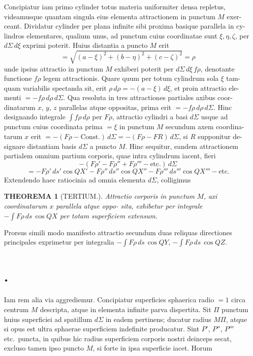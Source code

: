 \documentclass[12pt,a4paper]{article}
\theoremstyle{gauss}
\newtheorem*{theorema}{THEOREMA}
\begin{document}
Concipiatur iam primo cylinder totus materia uniformiter densa repletus,
videamusque quantam singula eius elementa attractionem in punctum $M$ exer-
ceant. Dividatur cylinder per plana infinite sibi proxima basique parallela in cy-
lindros elementares, qualium unus, ad punctum cuius coordinatae sunt $\xi,\eta,\zeta$,
per $d\Sigma\,d\xi$ exprimi poterit. Huius distantia a puncto $M$ erit
\[
= \sqrt{(a-\xi)^2 + (b-\eta)^2 + (c-\zeta)^2} = \rho
\]
unde ipsius attractio in punctum $M$ exhiberi poterit per $d\Sigma\,d\xi\,f\rho$, denotante
functione $f\rho$ legem attractionis. Quare quum per totum cylindrum sola $\xi$ tam-
quam variabilis spectanda sit, erit $\rho\,d\rho = -(a-\xi)\,d\xi$, et proin attractio ele-
menti $= -f\rho\,d\rho\,d\Sigma$. Qua resoluta in tres attractiones partiales axibus coor-
dinatarum $x$, $y$, $z$ parallelas atque oppositas, prima erit $= -f\rho\,d\rho\,d\Sigma$. Hinc
designando integrale $\int f\rho\,d\rho$ per $F\rho$, attractio cylindri a basi $d\Sigma$ usque ad
punctum cuius coordinata prima $=\xi$ in punctum $M$ secundum axem coordina-
tarum $x$ erit $= -(F\rho - \text{Const.})\,d\Sigma = -(F\rho - FR)\,d\Sigma$, si $R$ supponitur de-
signare distantiam basis $d\Sigma$ a puncto $M$. Hinc sequitur, eandem attractionem
partialem omnium partium corporis, quae intra cylindrum iacent, fieri
\[
-(F\rho' - F\rho'' + F\rho''' - \text{etc.})\,d\Sigma
\]
\[
= -F\rho'\,ds'\cos QX' - F\rho''\,ds''\cos QX'' - F\rho'''\,ds'''\cos QX''' - \text{etc.}
\]
Extendendo haec ratiocinia ad omnia elementa $d\Sigma$, colligimus

\begin{theorema}[TERTIUM.]
Attractio corporis in punctum $M$, axi coordinatarum $x$ parallela atque oppo-
sita, exhibetur per integrale $-\int F\rho\,ds\,\cos QX$ per totam superficiem extensum.
\end{theorema}

Prorsus simili modo manifesto attractio secundum duas reliquas directiones
principales exprimetur per integralia $-\int F\rho\,ds\,\cos QY$, $-\int F\rho\,ds\,\cos QZ$.

\newpage
\setcounter{page}{15}

\section*{%
%
\thesection.}

Iam rem alia via aggrediemur. Concipiatur superficies sphaerica radio $=1$
circa centrum $M$ descripta, atque in elementa infinite parva dispertita. Sit $\Pi$
punctum huius superficiei ad spatillum $d\Sigma$ in eadem pertinens; ducatur radius
$M\Pi$, atque si opus est ultra sphaerae superficiem indefinite producatur. Sint
$P'$, $P''$, $P'''$ etc.~puncta, in quibus hic radius superficiem corporis nostri deinceps
secat, excluso tamen ipso puncto $M$, si forte in ipsa superficie iacet. Horum
\end{document}
